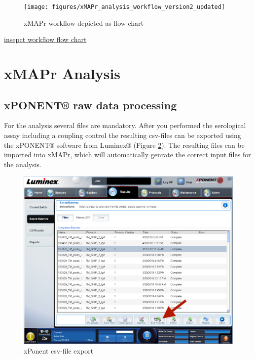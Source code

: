 \documentclass[
]{book}
\begin{document}
\begin{figure}

{\centering \texttt{[image: figures/xMAPr\_analysis\_workflow\_version2\_updated]} 

}

\caption{xMAPr workflow depicted as flow chart}\label{fig:xMAPrWorkflow}
\end{figure}

\href{figures/xMAPr_analysis_workflow_version2_updated.png}{insepct workflow flow chart}

\hypertarget{xmapr-analysis}{%
\section{xMAPr Analysis}\label{xmapr-analysis}}

\hypertarget{xponent-raw-data-processing}{%
\subsection{xPONENT® raw data processing}\label{xponent-raw-data-processing}}

For the analysis several files are mandatory. After you performed the serological assay including a coupling control the resulting csv-files can be exported using the xPONENT® software from Luminex® (Figure \ref{fig:xPonentCSVexport}). The resulting files can be imported into xMAPr, which will automatically genrate the correct input files for the analysis.

\begin{figure}

{\centering \includegraphics[width=17.81in]{figures/xPonent_export} 

}

\caption{xPonent csv-file export}\label{fig:xPonentCSVexport}
\end{figure}
\end{document}
